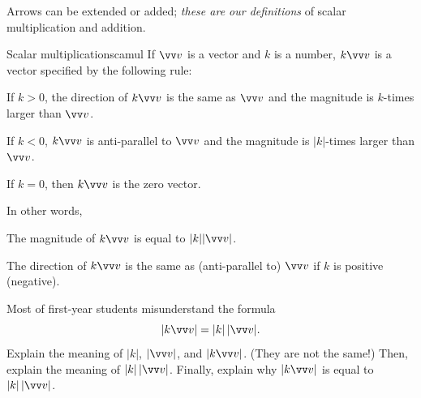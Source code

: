 \documentclass[11pt,pdfa,lastpage]{MishoNote}
\begin{document}
Arrows can be extended or added; \emph{these are our definitions} of scalar multiplication and addition.
%
\begin{definition}{Scalar multiplication}{scamul}
If $\vc v$ is a vector and $k$ is a number, $k\vc v$ is a vector specified by the following rule:
\begin{miniitemize}
  \item If $k>0$, the direction of $k\vc v$ is the same as $\vc v$ and the magnitude is $k$-times larger than $\vc v$.
  \item If $k<0$, $k\vc v$ is anti-parallel to $\vc v$ and the magnitude is $|k|$-times larger than $\vc v$.
  \item If $k=0$, then $k\vc v$ is the zero vector.
\end{miniitemize}
In other words,
\begin{miniitemize}
  \item The magnitude of $k \vc v$ is equal to $|k||\vc v|$.
  \item The direction of $k \vc v$ is the same as (anti-parallel to) $\vc v$ if $k$ is positive (negative).
\end{miniitemize}
\end{definition}

\begin{quizzes}
  \Quiz[S] Most of first-year students misunderstand the formula
\begin{equation}
  |k\vc v|=|k|\,|\vc v|.
\end{equation}
  Explain the meaning of $|k|$, $|\vc v|$, and $|k\vc v|$. (They are not the same!) Then, explain the meaning of $|k|\,|\vc v|$. Finally, explain why $|k\vc v|$ is equal to $|k|\,|\vc v|$.

\end{quizzes}

\newpage
\end{document}
